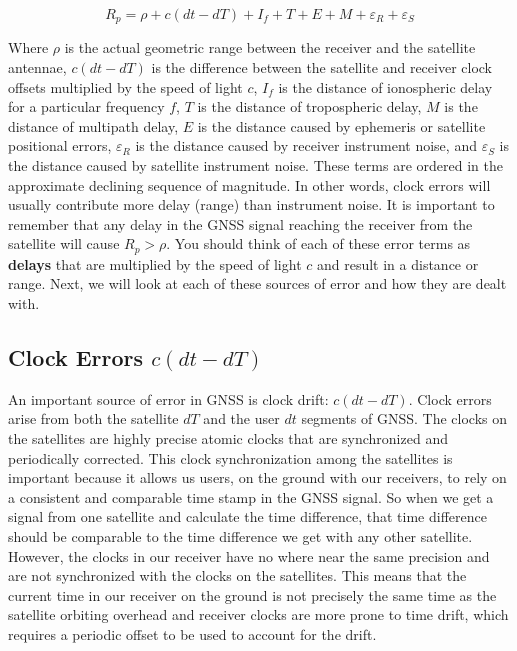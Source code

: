 \documentclass[
]{book}
\begin{document}
\[
R_p=ρ+c(dt-dT)+I_f+T+E+M+ε_R+ε_S
\]

Where \(ρ\) is the actual geometric range between the receiver and the satellite antennae, \(c(dt-dT)\) is the difference between the satellite and receiver clock offsets multiplied by the speed of light \(c\), \(I_f\) is the distance of ionospheric delay for a particular frequency \(f\), \(T\) is the distance of tropospheric delay, \(M\) is the distance of multipath delay, \(E\) is the distance caused by ephemeris or satellite positional errors, \(ε_R\) is the distance caused by receiver instrument noise, and \(ε_S\) is the distance caused by satellite instrument noise. These terms are ordered in the approximate declining sequence of magnitude. In other words, clock errors will usually contribute more delay (range) than instrument noise. It is important to remember that any delay in the GNSS signal reaching the receiver from the satellite will cause \(R_p>ρ\). You should think of each of these error terms as \textbf{delays} that are multiplied by the speed of light \(c\) and result in a distance or range. Next, we will look at each of these sources of error and how they are dealt with.

\hypertarget{clock-errors-cdt-dt}{%
\subsection{\texorpdfstring{Clock Errors \(c(dt-dT)\)}{Clock Errors c(dt-dT)}}\label{clock-errors-cdt-dt}}

An important source of error in GNSS is clock drift: \(c(dt-dT)\). Clock errors arise from both the satellite \(dT\) and the user \(dt\) segments of GNSS. The clocks on the satellites are highly precise atomic clocks that are synchronized and periodically corrected. This clock synchronization among the satellites is important because it allows us users, on the ground with our receivers, to rely on a consistent and comparable time stamp in the GNSS signal. So when we get a signal from one satellite and calculate the time difference, that time difference should be comparable to the time difference we get with any other satellite. However, the clocks in our receiver have no where near the same precision and are not synchronized with the clocks on the satellites. This means that the current time in our receiver on the ground is not precisely the same time as the satellite orbiting overhead and receiver clocks are more prone to time drift, which requires a periodic offset to be used to account for the drift.
\end{document}
